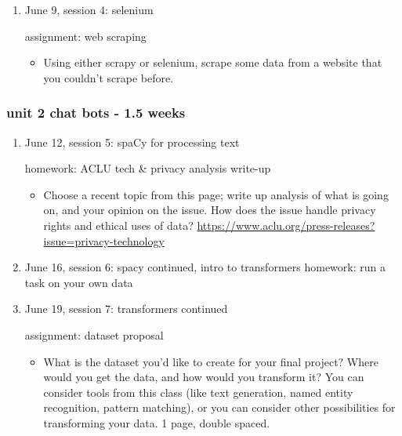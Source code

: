 \documentclass[11pt]{article}
\begin{document}
\begin{enumerate}
\item June 9, session 4: selenium
\label{sec:org85431e1}

assignment: web scraping
\begin{itemize}
\item Using either scrapy or selenium, scrape some data from a website
that you couldn't scrape before.
\end{itemize}
\end{enumerate}

\subsubsection{unit 2 chat bots - 1.5 weeks}
\label{sec:org1b15ebc}
\begin{enumerate}
\item June 12, session 5: spaCy for processing text
\label{sec:orgf5b4ba2}

homework: ACLU tech \& privacy analysis write-up
\begin{itemize}
\item Choose a recent topic from this page; write up analysis of what is
going on, and your opinion on the issue. How does the issue handle
privacy rights and ethical uses of data?
\url{https://www.aclu.org/press-releases?issue=privacy-technology}
\end{itemize}

\item June 16, session 6: spacy continued, intro to transformers
\label{sec:org5f3bdf9}
homework: run a task on your own data

\item June 19, session 7: transformers continued
\label{sec:org00d8e05}

assignment: dataset proposal
\begin{itemize}
\item What is the dataset you'd like to create for your final project?
Where would you get the data, and how would you transform it? You
can consider tools from this class (like text generation, named
entity recognition, pattern matching), or you can consider other
possibilities for transforming your data. 1 page, double spaced.
\end{itemize}
\end{enumerate}
\end{document}
